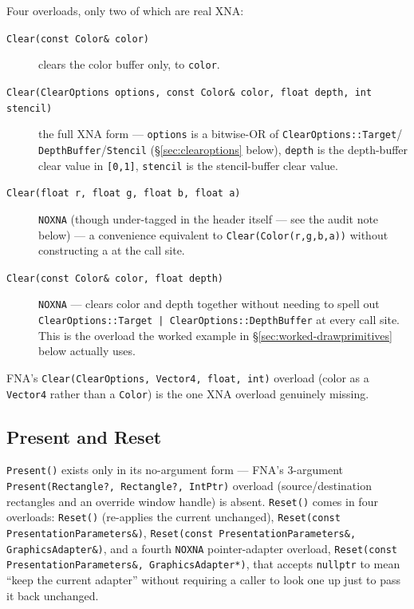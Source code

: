 Four overloads, only two of which are real XNA:

\begin{description}
\item[\texttt{Clear(const Color\& color)}] clears the color buffer only, to \texttt{color}.
\item[\texttt{Clear(ClearOptions options, const Color\& color, float depth, int stencil)}]
  the full XNA form --- \texttt{options} is a bitwise-OR of \texttt{ClearOptions::Target}/%
  \texttt{DepthBuffer}/\texttt{Stencil} (\S\ref{sec:clearoptions} below), \texttt{depth} is the
  depth-buffer clear value in \texttt{[0,1]}, \texttt{stencil} is the stencil-buffer clear value.
\item[\texttt{Clear(float r, float g, float b, float a)}] \texttt{NOXNA} (though under-tagged
  in the header itself --- see the audit note below) --- a convenience equivalent to
  \texttt{Clear(Color(r,g,b,a))} without constructing a  at the call site.
\item[\texttt{Clear(const Color\& color, float depth)}] \texttt{NOXNA} --- clears color and
  depth together without needing to spell out \texttt{ClearOptions::Target |
  ClearOptions::DepthBuffer} at every call site. This is the overload the worked example in
  \S\ref{sec:worked-drawprimitives} below actually uses.
\end{description}

FNA's \texttt{Clear(ClearOptions, Vector4, float, int)} overload (color as a \texttt{Vector4}
rather than a \texttt{Color}) is the one XNA overload genuinely missing.

\subsection{Present and Reset}

\texttt{Present()} exists only in its no-argument form --- FNA's 3-argument
\texttt{Present(Rectangle?, Rectangle?, IntPtr)} overload (source/destination rectangles and an
override window handle) is absent. \texttt{Reset()} comes in four overloads:
\texttt{Reset()} (re-applies the current  unchanged),
\texttt{Reset(const PresentationParameters\&)}, \texttt{Reset(const PresentationParameters\&,
GraphicsAdapter\&)}, and a fourth \texttt{NOXNA} pointer-adapter overload,
\texttt{Reset(const PresentationParameters\&, GraphicsAdapter*)}, that accepts \texttt{nullptr}
to mean ``keep the current adapter'' without requiring a caller to look one up just to pass it
back unchanged.

